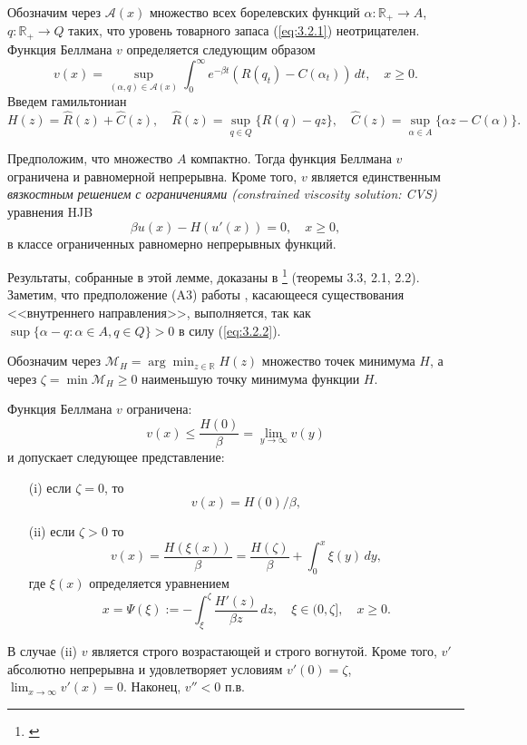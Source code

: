 \documentclass[twoside,12pt]{article}
\begin{document}
Обозначим через $\mathscr A(x)$ множество всех борелевских функций $\alpha:\mathbb R_+\to A$, $q:\mathbb R_+\to Q$ таких, что уровень товарного запаса (\ref{eq:3.2.1}) неотрицателен. Функция Беллмана $v$ определяется следующим образом
\begin{equation} \label{eq:3.2.4}
v(x)=\sup_{(\alpha,q)\in\mathscr A(x)}\int_0^\infty e^{-\beta t} (R(q_t)-C(\alpha_t))\,dt, \quad x\ge 0.
\end{equation}
Введем гамильтониан
\begin{equation}
H(z)=\widehat R(z)+\widehat C(z),\quad \widehat R(z)=\sup_{q\in Q}\{R(q)-qz\},\quad
\widehat C(z)=\sup_{\alpha\in A}\{\alpha z-C(\alpha)\}.
\end{equation}
\begin{lemma} \label{lem:3.1}
Предположим, что множество $A$ компактно. Тогда функция Беллмана $v$ ограничена и равномерной непрерывна. Кроме того, $v$ является единственным \emph{вязкостным решением с ограничениями (constrained viscosity solution: CVS)} уравнения HJB
$$ \beta u(x)-H(u'(x))=0,\quad x\ge 0, $$
в классе ограниченных равномерно непрерывных функций.
\end{lemma}
Результаты, собранные в этой лемме, доказаны в \footnote{\label{Son} \supercite{Son86}} (теоремы 3.3, 2.1, 2.2).
Заметим, что предположение (A3) работы , касающееся существования <<внутреннего направления>>, выполняется, так как $\sup\{\alpha-q:\alpha\in A, q\in Q\}>0$ в силу (\ref{eq:3.2.2}).

Обозначим через $\mathscr M_H=\arg\min_{z\in\mathbb R} H(z)$ множество точек минимума $H$, а через $\zeta=\min\mathscr M_H\ge 0$ наименьшую точку минимума функции $H$.
\begin{theorem} \label{th:3.1}
Функция Беллмана $v$ ограничена:
$$ v(x)\le \frac{H(0)}{\beta}=\lim_{y\to\infty} v(y)$$
и допускает следующее представление:
\begin{itemize}
\item[(i)] если $\zeta=0$, то
$$v(x)=H(0)/\beta, $$
\item[(ii)] если $\zeta>0$ то
$$ v(x)=\frac{H(\xi(x))}{\beta}=\frac{H(\zeta)}{\beta}+\int_0^x\xi(y)\,dy, $$
где $\xi(x)$ определяется уравнением
$$x=\Psi(\xi):=-\int_\xi^{\zeta}\frac{H'(z)}{\beta z}\,dz,\quad \xi\in (0,\zeta],\quad x\ge 0.$$
\end{itemize}
В случае (ii) $v$ является строго возрастающей и строго вогнутой. Кроме того, $v'$ абсолютно непрерывна и удовлетворяет условиям $v'(0)=\zeta$, $\lim_{x\to\infty} v'(x)=0.$ Наконец, $v''<0$ п.в.
\end{theorem}
\end{document}
